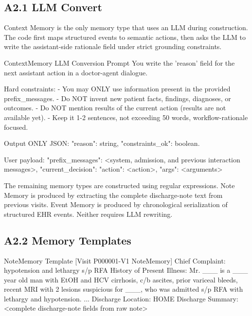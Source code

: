 \subsection*{A2.1 LLM Convert}

Context Memory is the only memory type that uses an LLM during construction. The code first maps structured events to semantic actions, then asks the LLM to write the assistant-side rationale field under strict grounding constraints.

\begin{promptblock}{ContextMemory LLM Conversion Prompt}
You write the 'reason' field for the next assistant action in a
doctor-agent dialogue.

Hard constraints:
- You may ONLY use information present in the provided prefix_messages.
- Do NOT invent new patient facts, findings, diagnoses, or outcomes.
- Do NOT mention results of the current action (results are not available yet).
- Keep it 1-2 sentences, not exceeding 50 words, workflow-rationale focused.

Output ONLY JSON: {"reason": string, "constraints_ok": boolean}.

User payload:
{
  "prefix_messages": <system, admission, and previous interaction messages>,
  "current_decision": {"action": <action>, "args": <arguments>}
}
\end{promptblock}

The remaining memory types are constructed using regular expressions. Note Memory is produced by extracting the complete discharge-note text from previous visits. Event Memory is produced by chronological serialization of structured EHR events. Neither requires LLM rewriting.

\subsection*{A2.2 Memory Templates}

\begin{promptblock}{NoteMemory Template}
[Visit P000001-V1 NoteMemory]
Chief Complaint: hypotension and lethargy s/p RFA
History of Present Illness: Mr. ___ is a ___ year old man with
EtOH and HCV cirrhosis, c/b ascites, prior variceal bleeds, recent MRI
with 2 lesions suspicious for ___, who was admitted s/p RFA with
lethargy and hypotension. ...
Discharge Location: HOME
Discharge Summary: <complete discharge-note fields from raw note>
\end{promptblock}

